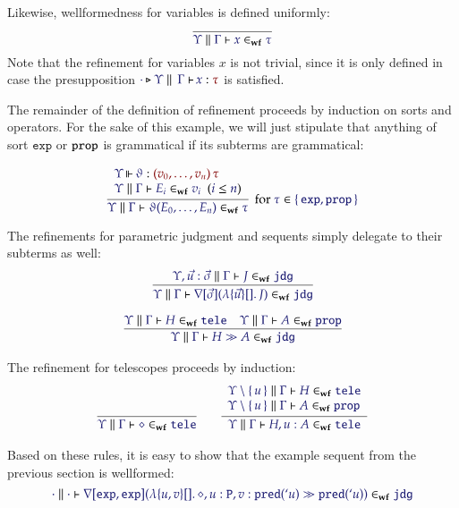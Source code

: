 \documentclass[11pt]{article}
\theoremstyle{definition}
\theoremstyle{remark}
\numberwithin{equation}{section}
\newcommand\SortExp{\mathtt{exp}}
\newcommand\IsWf[4]{%
  \IMode{#1}\parallel%
  \IMode{#2}\vdash%
  \IMode{#3}\in_{\mathbf{wf}}\IMode{#4}%
}
\begin{document}
Likewise, wellformedness for variables is defined uniformly:
\[
  \infer{
    \IsWf{\Upsilon}{\Gamma}{x}{\tau}
  }{
  }
\]
Note that the refinement for variables $x$ is not trivial, since it is only
defined in case the presupposition $\IsAbt{\cdot}{\Upsilon}{\Gamma}{x}{\tau}$
is satisfied.

The remainder of the definition of refinement proceeds by induction on sorts and
operators. For the sake of this example, we will just stipulate that anything of
sort $\SortExp$ or $\mathtt{prop}$ is grammatical if its subterms are grammatical:

\[
  \infer[
    \text{for $\Member{\tau}{\MkSet{\SortExp,\SortProp}}$}
  ]{
    \IsWf{\Upsilon}{\Gamma}{
      \App{\vartheta}{E_0,\dots,E_n}
    }{\tau}
  }{
    \begin{array}{l}
      \IsOperator{\Upsilon}{\vartheta}{
        \MkArity{
          v_0,\dots,v_n
        }{\tau}
      }
\\
      \HypJ{
        \IsWf{\Upsilon}{\Gamma}{E_i}{v_i}
      }{
        \Leq{i}{n}
      }
    \end{array}
  }
\]

The refinements for parametric judgment and sequents simply delegate to their
subterms as well:
\begin{gather*}
  \infer{
    \IsWf{\Upsilon}{\Gamma}{
      \App{\OpNabla{\vec{\sigma}}}{
        \MkBTm{\vec{u}}{}{J}
      }
    }{\SortJdg}
  }{
    \IsWf{\Upsilon,\vec{u}:\vec{\sigma}}{\Gamma}{J}{\SortJdg}
  }
\\[6pt]
  \infer{
    \IsWf{\Upsilon}{\Gamma}{
      H\gg A
    }{\SortJdg}
  }{
    \IsWf{\Upsilon}{\Gamma}{H}{\SortTele}
&
    \IsWf{\Upsilon}{\Gamma}{A}{\SortProp}
  }
\end{gather*}

The refinement for telescopes proceeds by induction:
\begin{gather*}
  \infer{
    \IsWf{\Upsilon}{\Gamma}{\diamond}{\SortTele}
  }{
  }
\qquad
  \infer{
    \IsWf{\Upsilon}{\Gamma}{H,u:A}{\SortTele}
  }{
    \begin{array}{l}
      \IsWf{\Upsilon\setminus\MkSet{u}}{\Gamma}{H}{\SortTele}
\\
      \IsWf{\Upsilon\setminus\MkSet{u}}{\Gamma}{A}{\SortProp}
    \end{array}
  }
\end{gather*}

Based on these rules, it is easy to show that the example sequent from the
previous section is wellformed:
\[
  \IsWf{\cdot}{\cdot}{
    \App{\OpNabla{\SortExp,\SortExp}}{
      \MkBTm{u,v}{}{
        \diamond,u:\mathtt{P},v:\App{\mathtt{pred}}{`u}
        \gg
        \App{\mathtt{pred}}{`u}
      }
    }
  }{\SortJdg}
\]
\end{document}
